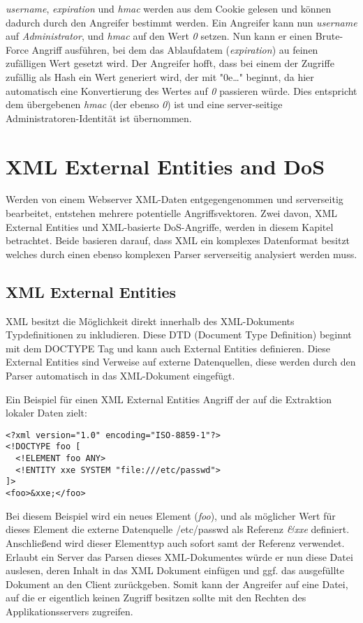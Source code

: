 \textit{username}, \textit{expiration} und \textit{hmac} werden aus dem Cookie gelesen und können dadurch durch den Angreifer bestimmt werden. Ein Angreifer kann nun \textit{username} auf \textit{Administrator}, und \textit{hmac} auf den Wert \textit{0} setzen. Nun kann er einen Brute-Force Angriff ausführen, bei dem das Ablaufdatem (\textit{expiration}) au feinen zufälligen Wert gesetzt wird. Der Angreifer hofft, dass bei einem der Zugriffe zufällig als Hash ein Wert generiert wird, der mit "0e\ldots" beginnt, da hier automatisch eine Konvertierung des Wertes auf \textit{0} passieren würde. Dies entspricht dem übergebenen \textit{hmac} (der ebenso \textit{0}) ist und eine server-seitige Administratoren-Identität ist übernommen.

\section{XML External Entities and DoS}

Werden von einem Webserver XML-Daten entgegengenommen und serverseitig bearbeitet, entstehen mehrere potentielle Angriffsvektoren. Zwei davon, XML External Entities und XML-basierte DoS-Angriffe, werden in diesem Kapitel betrachtet. Beide basieren darauf, dass XML ein komplexes Datenformat besitzt welches durch einen ebenso komplexen Parser serverseitig analysiert werden muss.

\subsection{XML External Entities}

XML besitzt die Möglichkeit direkt innerhalb des XML-Dokuments Typdefinitionen zu inkludieren. Diese DTD (Document Type Definition) beginnt mit dem DOCTYPE Tag und kann auch External Entities definieren. Diese External Entities sind Verweise auf externe Datenquellen, diese werden durch den Parser automatisch in das XML-Dokument eingefügt.

Ein Beispiel für einen XML External Entities Angriff der auf die Extraktion lokaler Daten zielt:

\begin{verbatim}
<?xml version="1.0" encoding="ISO-8859-1"?>
<!DOCTYPE foo [  
  <!ELEMENT foo ANY>
  <!ENTITY xxe SYSTEM "file:///etc/passwd">
]>
<foo>&xxe;</foo>
\end{verbatim}

Bei diesem Beispiel wird ein neues Element (\textit{foo}), und als möglicher Wert für dieses Element die externe Datenquelle /etc/passwd als Referenz \textit{\&xxe} definiert. Anschließend wird dieser Elementtyp auch sofort samt der Referenz verwendet. Erlaubt ein Server das Parsen dieses XML-Dokumentes würde er nun diese Datei auslesen, deren Inhalt in das XML Dokument einfügen und ggf. das ausgefüllte Dokument an den Client zurückgeben. Somit kann der Angreifer auf eine Datei, auf die er eigentlich keinen Zugriff besitzen sollte mit den Rechten des Applikationsservers zugreifen.

